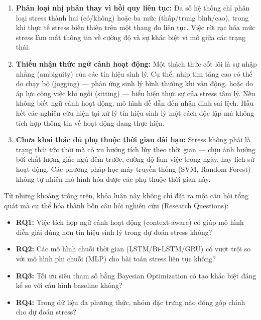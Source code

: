 \begin{enumerate}
    \item \textbf{Phân loại nhị phân thay vì hồi quy liên tục:} Đa số hệ thống chỉ phân loại stress thành hai (có/không) hoặc ba mức (thấp/trung bình/cao), trong khi thực tế stress biến thiên trên một thang đo liên tục. Việc rời rạc hóa mức stress làm mất thông tin về cường độ và sự khác biệt vi mô giữa các trạng thái.
    
    \item \textbf{Thiếu nhận thức ngữ cảnh hoạt động:} Một thách thức cốt lõi là sự nhập nhằng (ambiguity) của các tín hiệu sinh lý. Cụ thể, nhịp tim tăng cao có thể do chạy bộ (jogging) — phản ứng sinh lý bình thường khi vận động, hoặc do áp lực công việc khi ngồi (sitting) — biểu hiện thực sự của stress tâm lý. Nếu không biết ngữ cảnh hoạt động, mô hình dễ dẫn đến nhận định sai lệch. Hầu hết các nghiên cứu hiện tại xử lý tín hiệu sinh lý một cách độc lập mà không tích hợp thông tin về hoạt động đang thực hiện.
    
    \item \textbf{Chưa khai thác đủ phụ thuộc thời gian dài hạn:} Stress không phải là trạng thái tức thời mà có xu hướng tích lũy theo thời gian — chịu ảnh hưởng bởi chất lượng giấc ngủ đêm trước, cường độ làm việc trong ngày, hay lịch sử hoạt động. Các phương pháp học máy truyền thống (SVM, Random Forest) không tự nhiên mô hình hóa được các phụ thuộc thời gian này.
\end{enumerate}

Từ những khoảng trống trên, khóa luận này không chỉ đặt ra một câu hỏi tổng quát mà cụ thể hóa thành bốn câu hỏi nghiên cứu (Research Questions):

\begin{itemize}
    \item \textbf{RQ1:} Việc tích hợp ngữ cảnh hoạt động (context-aware) có giúp mô hình diễn giải đúng hơn tín hiệu sinh lý trong dự đoán stress không?
    \item \textbf{RQ2:} Các mô hình chuỗi thời gian (LSTM/Bi-LSTM/GRU) có vượt trội so với mô hình phi chuỗi (MLP) cho bài toán stress liên tục không?
    \item \textbf{RQ3:} Tối ưu siêu tham số bằng Bayesian Optimization có tạo khác biệt đáng kể so với cấu hình baseline không?
    \item \textbf{RQ4:} Trong dữ liệu đa phương thức, nhóm đặc trưng nào đóng góp chính cho dự đoán stress?
\end{itemize}

